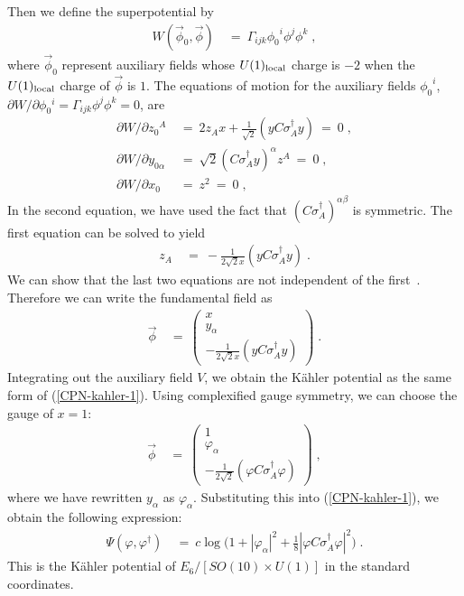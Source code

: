 \documentclass[a4paper,11pt]{article}
\newcommand{\del}{\partial}
\newcommand{\kahler}{K\"{a}hler }
\newcommand{\bsubeq}{\begin{subequations}}
\newcommand{\esubeq}{\end{subequations}}
\begin{document}
{Then we define the superpotential by  
\begin{align}
 W (\vec{\phi}_0, \vec{\phi}) 
\ &= \ 
\Gamma_{ijk} {\phi_0}^i \phi^j \phi^k \; ,
\end{align}
where $\vec{\phi}_0$ represent auxiliary fields whose 
$U(1)_{\rm local}$ charge is $-2$ when  
the $U(1)_{\rm local}$ charge of $\vec{\phi}$ is $1$. 
The equations of motion for the auxiliary fields ${\phi_0}^i$, 
$\del W /\del \phi_0{}^i = \Gamma_{ijk} \phi^j \phi^k = 0$, 
are 
\bsubeq
\label{E6_F-flat}
\begin{align}
\del W / \del {z_0}^A 
\ &= \ 2 z_A x + \frac{1}{\sqrt{2}} ( y C \sigma_A^{\dagger} y ) \ = \
0 \; , \\ 
\del W / \del y_{0\alpha} 
\ &= \ \sqrt{2} (C \sigma_A^{\dagger} y)^{\alpha} z^A  
\ = \ 0 \;, \\
\del W / \del x_0 
\ &= \ z^2 \ = \ 0 \; ,
\end{align}
\esubeq
In the second equation, we have used the fact that 
$(C \sigma_A^{\dagger})^{\alpha\beta}$ is symmetric.
The first equation can be solved to yield
\begin{align}
z_A \ &= \ - \frac{1}{2 \sqrt{2} x} ( y C \sigma_A^{\dagger} y) \; . 
\label{E6-constraint}
\end{align}
We can show that the last two equations 
are not independent of the first~\cite{HN1}. 
Therefore we can write the fundamental field as
\begin{align}
\vec{\phi} \ &= \ \left(
\begin{array}{c}
x \\
y_{\alpha} \\
- \frac{1}{2 \sqrt{2} x}(y C \sigma_A^{\dagger} y)
\end{array} \right) \; . \label{csf-e6-1}
\end{align}
Integrating out the auxiliary field $V$,
we obtain the \kahler potential as the same form of
(\ref{CPN-kahler-1}).
Using complexified gauge symmetry, 
we can choose the gauge of $x=1$: 
\begin{align}
\vec{\phi} \ &= \ \left(
\begin{array}{c}
1 \\
\varphi_{\alpha} \\
- \frac{1}{2 \sqrt{2}}(\varphi C \sigma_A^{\dagger} \varphi)
\end{array} \right) \; ,
\end{align}
where we have rewritten $y_{\alpha}$ as $\varphi_{\alpha}$.  
Substituting this into (\ref{CPN-kahler-1}), we obtain the
following expression:
\begin{align}
\Psi (\varphi, \varphi^{\dagger}) 
\ &= \ 
c \log 
\Big( 1 + |\varphi_{\alpha}|^2 
+ \frac{1}{8} | \varphi C \sigma_A^{\dagger} \varphi |^2 \Big) \; . 
\label{E6-Kahler}
\end{align}
This is the \kahler potential of $E_6/[SO(10)\times U(1)]$ 
in the standard coordinates.  

}
\end{document}
